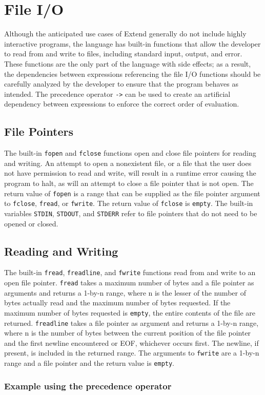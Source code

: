 \section{File I/O}
\label{sec:IO}
Although the anticipated use cases of Extend generally do not include highly interactive programs, the language has built-in functions that allow the developer to read from and write to files, including standard input, output, and error. These functions are the only part of the language with side effects; as a result, the dependencies between expressions referencing the file I/O functions should be carefully analyzed by the developer to ensure that the program behaves as intended. The precedence operator \texttt{->} can be used to create an artificial dependency between expressions to enforce the correct order of evaluation.
\subsection{File Pointers}
The built-in \texttt{fopen} and \texttt{fclose} functions open and close file pointers for reading and writing. An attempt to open a nonexistent file, or a file that the user does not have permission to read and write, will result in a runtime error causing the program to halt, as will an attempt to close a file pointer that is not open. The return value of \texttt{fopen} is a range that can be supplied as the file pointer argument to \texttt{fclose}, \texttt{fread}, or \texttt{fwrite}. The return value of \texttt{fclose} is \texttt{empty}. The built-in variables \texttt{STDIN}, \texttt{STDOUT}, and \texttt{STDERR} refer to file pointers that do not need to be opened or closed.
\subsection{Reading and Writing}
The built-in \texttt{fread}, \texttt{freadline}, and \texttt{fwrite} functions read from and write to an open file pointer.  \texttt{fread} takes a maximum number of bytes and a file pointer as arguments and returns a 1-by-n range, where n is the lesser of the number of bytes actually read and the maximum number of bytes requested. If the maximum number of bytes requested is \texttt{empty}, the entire contents of the file are returned. \texttt{freadline} takes a file pointer as argument and returns a 1-by-n range, where n is the number of bytes between the current position of the file pointer and the first newline encountered or EOF, whichever occurs first. The newline, if present, is included in the returned range. The arguments to \texttt{fwrite} are a 1-by-n range and a file pointer and the return value is \texttt{empty}.
\subsubsection{Example using the precedence operator}

